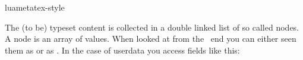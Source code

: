 

\environment luametatex-style

\startdocument[title=Nodes]

\startsubject[title=Contents]
    \setups[sectioncontents]
\stopsubject

\startsection[title={Introduction}]

The (to be) typeset content is collected in a double linked list of so called
nodes. A node is an array of values. When looked at from the \LUA\ end you can
either seen them as  or as . In the case of userdata you access fields like this:

